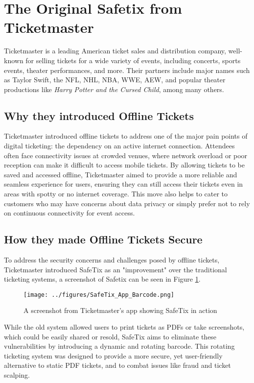 \section{The Original Safetix from Ticketmaster}
Ticketmaster is a leading American ticket sales and distribution company, well-known for selling tickets for a wide variety of events, 
including concerts, sports events, theater performances, and more. Their partners include major names such as Taylor Swift, 
the NFL, NHL, NBA, WWE, AEW, and popular theater productions like \textit{Harry Potter and the Cursed Child}, among many others. 

\subsection{Why they introduced Offline Tickets}
Ticketmaster introduced offline tickets to address one of the major pain points of digital ticketing: the dependency on an active internet connection. 
Attendees often face connectivity issues at crowded venues, where network overload or poor reception can make it difficult to access mobile tickets. 
By allowing tickets to be saved and accessed offline, Ticketmaster aimed to provide a more reliable and seamless experience for users, 
ensuring they can still access their tickets even in areas with spotty or no internet coverage. 
This move also helps to cater to customers who may have concerns about data privacy or simply prefer not to rely on continuous connectivity for event access.

\subsection{How they made Offline Tickets Secure}
To address the security concerns and challenges posed by offline tickets, Ticketmaster introduced SafeTix as an "improvement" over the traditional ticketing systems, a screenshot of Safetix can be seen in Figure
\ref{fig:app_barcode}.
\begin{figure}[H]
    \begin{center}        
    \texttt{[image: ../figures/SafeTix\_App\_Barcode.png]}
    \caption{A screenshot from Ticketmaster's app showing SafeTix in action \cite{ticketmaster_mobile_ticketing}}
    \label{fig:app_barcode}
    \end{center}
\end{figure}
While the old system allowed users to print tickets as PDFs or take screenshots, which could be easily shared or resold, SafeTix aims to eliminate these vulnerabilities by introducing a dynamic and rotating barcode. 
This rotating ticketing system was designed to provide a more secure, yet user-friendly alternative to static PDF tickets, and to combat issues like fraud and ticket scalping.

